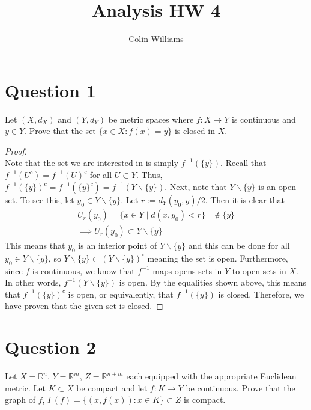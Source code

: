 \documentclass[10pt,a4paper]{article}
\title{Analysis HW 4}
\author{Colin Williams}
\theoremstyle{definition}
\theoremstyle{definition}
\numberwithin{equation}{section}
\begin{document}
\maketitle

\section*{Question 1}
Let $(X, d_X)$ and $(Y, d_Y)$ be metric spaces where $f: X \to Y$ is continuous and $y \in Y$. Prove that the set $\{x \in X : f(x) = y\}$ is closed in $X$. 

\begin{proof}$ $
\\Note that the set we are interested in is simply $f^{-1}(\{y\})$. Recall that $f^{-1}(U^c) = f^{-1}(U)^c$ for all $U \subset Y$. Thus, $f^{-1}(\{y\})^c = f^{-1}(\{y\}^c) = f^{-1}(Y \backslash \{y\})$. Next, note that $Y\backslash \{y\}$ is an open set. To see this, let $y_0 \in Y \backslash \{y\}$. Let $r := d_Y(y_0, y) / 2$. Then it is clear that 
\begin{align*}
U_r(y_0) = \{x \in Y \; | \; d(x, y_0) < r\} &\not \ni \{y\}\\
\implies U_r(y_0) \subset Y \backslash \{y\}
\end{align*}
This means that $y_0$ is an interior point of $Y \backslash \{y\}$ and this can be done for all $y_0 \in Y \backslash \{y\}$, so $Y \backslash \{y\} \subset (Y \backslash \{y\})^\circ$ meaning the set is open. Furthermore, since $f$ is continuous, we know that $f^{-1}$ maps opens sets in $Y$ to open sets in $X$. In other words, $f^{-1}(Y \backslash \{y\})$ is open. By the equalities shown above, this means that $f^{-1}(\{y\})^c$ is open, or equivalently, that $f^{-1}(\{y\})$ is closed. Therefore, we have proven that the given set is closed. 
\end{proof}

\section*{Question 2}
Let $X = \mathbb{R}^n$, $Y = \mathbb{R}^m$, $Z = \mathbb{R}^{n+m}$ each equipped with the appropriate Euclidean metric. Let $K \subset X$ be compact and let $f: K \to Y$ be continuous. Prove that the graph of $f$, $\Gamma(f) = \{(x, f(x)) : x \in K\} \subset Z$ is compact. 
\end{document}
